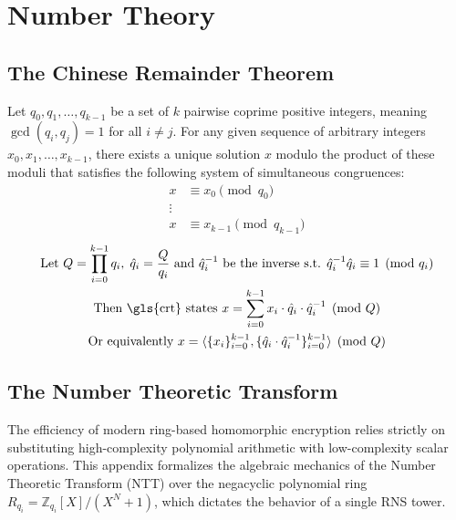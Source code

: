 \chapter{Number Theory}

\section{The Chinese Remainder Theorem}
\label{appendix:crt}

\begin{definition}
    \label{def:crt}
    Let $q_0, q_1, \dots, q_{k-1}$ be a set of $k$ pairwise coprime positive integers, meaning $\gcd(q_i, q_j) = 1$ for all $i \neq j$. For any given sequence of arbitrary integers $x_0, x_1, \dots, x_{k-1}$, there exists a unique solution $x$ modulo the product of these moduli that satisfies the following system of simultaneous congruences:
    \begin{align*}
        x &\equiv x_0 \pmod{q_0} \\
        \vdots \\
        x &\equiv x_{k-1} \pmod{q_{k-1}}
    \end{align*}
    \begin{gather}
        \nonumber
        \text{Let } Q = \prod_{i=0}^{k-1}q_i, \; \hat{q}_i = \frac{Q}{q_i} \text{ and } \hat{q}_i^{-1} \text{ be the inverse s.t. } \hat{q}_i^{-1}\hat{q}_i \equiv 1 \pmod{q_i}
        \\
        \text{Then \gls{crt} states } x = \sum_{i=0}^{k-1} x_i \cdot \hat{q}_i \cdot \hat{q}_i^{-1} \pmod{Q} 
        \\
        \label{eq:crt-gadget}
        \text{Or equivalently } x = \langle \{ x_i\}_{i=0}^{k-1}, \{\hat{q}_i\cdot\hat{q}_i^{-1} \}_{i=0}^{k-1} \rangle \pmod{Q}
    \end{gather}
\end{definition}

\section{The Number Theoretic Transform}
\label{appendix:ntt}
The efficiency of modern ring-based homomorphic encryption relies strictly on substituting high-complexity polynomial arithmetic with low-complexity scalar operations. This appendix formalizes the algebraic mechanics of the Number Theoretic Transform (NTT) over the negacyclic polynomial ring $R_{q_i} = \mathbb{Z}_{q_i}[X]/(X^N+1)$, which dictates the behavior of a single RNS tower.

